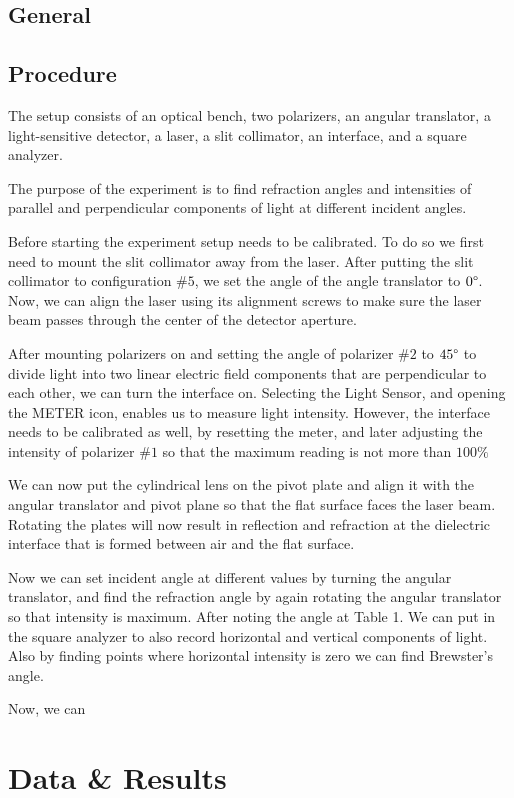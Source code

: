 \documentclass[10pt]{article}
\begin{document}
\subsection*{General}

\subsection*{Procedure} 
The setup consists of an optical bench, two polarizers, an angular translator, a light-sensitive detector, a laser, a slit collimator, an interface, and a square analyzer.

The purpose of the experiment is to find refraction angles and intensities of parallel and perpendicular components of light at different incident angles.

Before starting the experiment setup needs to be calibrated. To do so we first need to mount the slit collimator away from the laser. After putting the slit collimator to configuration $\#5$, we set the angle of the angle translator to $0\degree$. Now, we can align the laser using its alignment screws to make sure the laser beam passes through the center of the detector aperture. 

After mounting polarizers on and setting the angle of polarizer $\#2$ to $45\degree$ to divide light into two linear electric field components that are perpendicular to each other, we can turn the interface on. Selecting the Light Sensor, and opening the METER icon, enables us to measure light intensity. However, the interface needs to be calibrated as well, by resetting the meter, and later adjusting the intensity of polarizer $\#1$ so that the maximum reading is not more than $100\%$

We can now put the cylindrical lens on the pivot plate and align it with the angular translator and pivot plane so that the flat surface faces the laser beam. Rotating the plates will now result in reflection and refraction at the dielectric interface that is formed between air and the flat surface.

Now we can set incident angle at different values by turning the angular translator, and find the refraction angle by again rotating the angular translator so that intensity is maximum. After noting the angle at Table 1. We can put in the square analyzer to also record horizontal and vertical components of light. Also by finding points where horizontal intensity is zero we can find Brewster's angle.

Now, we can 
\section{Data \& Results}
\end{document}
